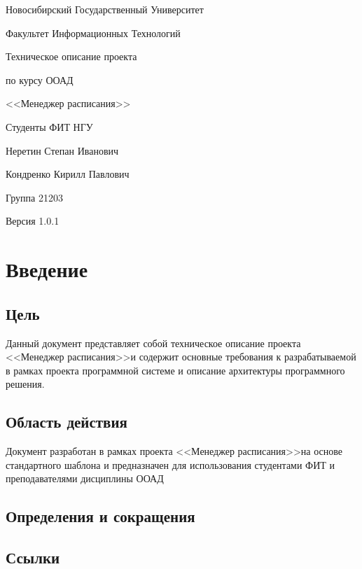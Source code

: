 \documentclass[a4paper]{report}
\newcommand{\ProjectName}{<<Менеджер расписания>>}
\newcommand{\Version}{1.0.1}
\begin{document}
	\pagestyle{empty}
	\begin{center}
		{\large Новосибирский Государственный Университет
		
		Факультет Информационных Технологий}
	\end{center}

	\begin{flushright}
		\bfseries{\huge Техническое описание проекта
		
		по курсу ООАД

		\bigskip

		\ProjectName
		
		\bigskip
		
		Студенты ФИТ НГУ
		
		Неретин Степан Иванович
		
		Кондренко Кирилл Павлович
		
		Группа 21203}
		
		\bigskip
		
		{\large Версия \Version}
	\end{flushright}

	{\hypersetup{hidelinks}\tableofcontents\pagestyle{fancy}}

	\pagestyle{fancy}

	\chapter{Введение}
		\section{Цель}
			Данный документ представляет собой техническое описание проекта \ProjectName и содержит основные требования к разрабатываемой в рамках проекта программной системе и описание архитектуры программного решения.
		\section{Область действия}
			Документ разработан в рамках проекта \ProjectName на основе стандартного шаблона и предназначен для использования студентами ФИТ и преподавателями дисциплины ООАД
		\section{Определения и сокращения}
	
		\section{Ссылки}
		
\end{document}
